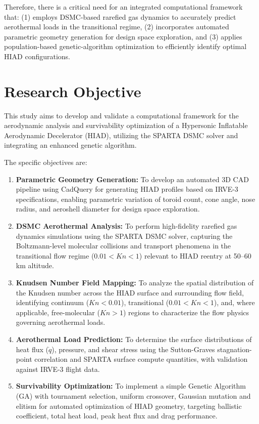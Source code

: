 Therefore, there is a critical need for an integrated computational framework that: (1) employs DSMC-based rarefied gas dynamics to accurately predict aerothermal loads in the transitional regime, (2) incorporates automated parametric geometry generation for design space exploration, and (3) applies population-based genetic-algorithm optimization to efficiently identify optimal HIAD configurations.

\section{Research Objective}
This study aims to develop and validate a computational framework for the aerodynamic analysis and survivability optimization of a Hypersonic Inflatable Aerodynamic Decelerator (HIAD), utilizing the SPARTA DSMC solver and integrating an enhanced genetic algorithm.

The specific objectives are:
\begin{enumerate}
    \item \textbf{Parametric Geometry Generation:} To develop an automated 3D CAD pipeline using CadQuery for generating HIAD profiles based on IRVE-3 specifications, enabling parametric variation of toroid count, cone angle, nose radius, and aeroshell diameter for design space exploration.

    \item \textbf{DSMC Aerothermal Analysis:} To perform high-fidelity rarefied gas dynamics simulations using the SPARTA DSMC solver, capturing the Boltzmann-level molecular collisions and transport phenomena in the transitional flow regime ($0.01 < Kn < 1$) relevant to HIAD reentry at 50--60 km altitude.

    \item \textbf{Knudsen Number Field Mapping:} To analyze the spatial distribution of the Knudsen number across the HIAD surface and surrounding flow field, identifying continuum ($Kn < 0.01$), transitional ($0.01 < Kn < 1$), and, where applicable, free-molecular ($Kn > 1$) regions to characterize the flow physics governing aerothermal loads.

    \item \textbf{Aerothermal Load Prediction:} To determine the surface distributions of heat flux ($\dot{q}$), pressure, and shear stress using the Sutton-Graves stagnation-point correlation and SPARTA surface compute quantities, with validation against IRVE-3 flight data.


    \item \textbf{Survivability Optimization:} To implement a simple Genetic Algorithm (GA) with tournament selection, uniform crossover, Gaussian mutation and elitism for automated optimization of HIAD geometry, targeting ballistic coefficient, total heat load, peak heat flux and drag performance.
\end{enumerate}

